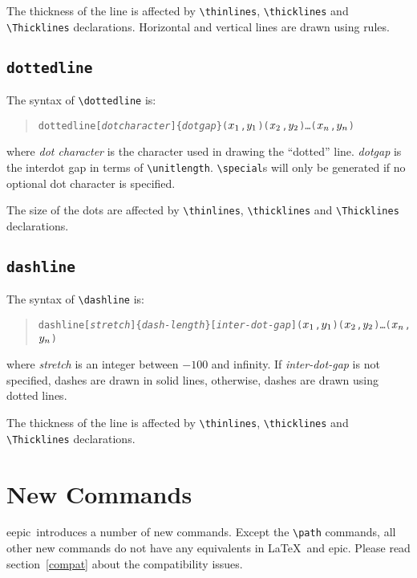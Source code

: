 \documentclass[11pt]{article}
\newcommand{\epic}{{\sc epic}}
\newcommand{\eepic}{{\sc eepic}}
\begin{document}
The thickness of the line is affected by \verb|\thinlines|,
\verb|\thicklines| and \verb|\Thicklines| declarations.
Horizontal and vertical lines are drawn using rules.


\subsection{\tt \BS dottedline}
The syntax of \verb|\dottedline| is:
\begin{quote}
\begin{alltt}
\BS{}dottedline[{\em{}dot character\/}]\{{\em{}dotgap\/}\}(\(x\sb{1}\),\(y\sb{1}\))(\(x\sb{2}\),\(y\sb{2}\))\ldots(\(x\sb{n}\),\(y\sb{n}\))
\end{alltt}
\end{quote}
where {\em dot character} is the character used in drawing the
``dotted'' line. {\em dotgap} is the interdot gap in terms of
\verb|\unitlength|. \verb|\special|s will only be generated if no
optional dot character is specified.

The size of the dots are affected by \verb|\thinlines|,
\verb|\thicklines| and \verb|\Thicklines| declarations.


\subsection{\tt \BS dashline}
The syntax of \verb|\dashline| is:
\begin{quote}
\begin{alltt}
\BS{}dashline[{\em{}stretch}]\{{\em{}dash-length}\}[{\em{}inter-dot-gap}](\(x\sb{1}\),\(y\sb{1}\))(\(x\sb{2}\),\(y\sb{2}\))\ldots(\(x\sb{n}\),\(y\sb{n}\))
\end{alltt}
\end{quote}
where {\em stretch} is an integer between $-100$ and infinity. If
{\em inter-dot-gap} is not specified, dashes are drawn in solid
lines, otherwise, dashes are drawn using dotted lines.

The thickness of the line is affected by \verb|\thinlines|,
\verb|\thicklines| and \verb|\Thicklines| declarations.


\clearpage


\section{New Commands}
\eepic\ introduces a number of new commands. Except the
\verb|\path| commands, all other new commands do not have any
equivalents in \LaTeX\ and \epic. Please read
section~\ref{compat} about the compatibility issues.
\end{document}
